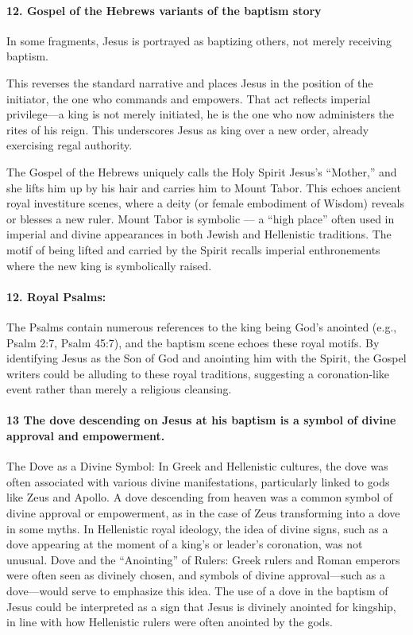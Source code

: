 \paragraph{12.
Gospel of the Hebrews variants of the baptism story}\label{par:gospel-of-the-hebrews-variants-of-the-baptism-story}

In some fragments, Jesus is portrayed as baptizing others, not merely receiving baptism.

This reverses the standard narrative and places Jesus in the position of the initiator, the one who commands and empowers.
That act reflects imperial privilege---a king is not merely initiated, he is the one who now administers the rites of his reign.
This underscores Jesus as king over a new order, already exercising regal authority.

The Gospel of the Hebrews uniquely calls the Holy Spirit Jesus's ``Mother,'' and she lifts him up by his hair and carries him to Mount Tabor.
This echoes ancient royal investiture scenes, where a deity (or female embodiment of Wisdom) reveals or blesses a new ruler.
Mount Tabor is symbolic --- a ``high place'' often used in imperial and divine appearances in both Jewish and Hellenistic traditions.
The motif of being lifted and carried by the Spirit recalls imperial enthronements where the new king is symbolically raised.

\paragraph{12.
Royal Psalms:}\label{par:royal-psalms}

The Psalms contain numerous references to the king being God's anointed (e.g., Psalm 2:7, Psalm 45:7), and the baptism scene echoes these royal motifs.
By identifying Jesus as the Son of God and anointing him with the Spirit, the Gospel writers could be alluding to these royal traditions, suggesting a coronation-like event rather than merely a religious cleansing.

\paragraph{13 The dove descending on Jesus at his baptism is a symbol of divine approval and empowerment.}\label{par:the-dove-descending-on-jesus-at-his-baptism-is-a-symbol-of-divine-approval-and-empowerment.}

The Dove as a Divine Symbol: In Greek and Hellenistic cultures, the dove was often associated with various divine manifestations, particularly linked to gods like Zeus and Apollo.
A dove descending from heaven was a common symbol of divine approval or empowerment, as in the case of Zeus transforming into a dove in some myths.
In Hellenistic royal ideology, the idea of divine signs, such as a dove appearing at the moment of a king's or leader's coronation, was not unusual.
Dove and the ``Anointing'' of Rulers: Greek rulers and Roman emperors were often seen as divinely chosen, and symbols of divine approval---such as a dove---would serve to emphasize this idea.
The use of a dove in the baptism of Jesus could be interpreted as a sign that Jesus is divinely anointed for kingship, in line with how Hellenistic rulers were often anointed by the gods.

